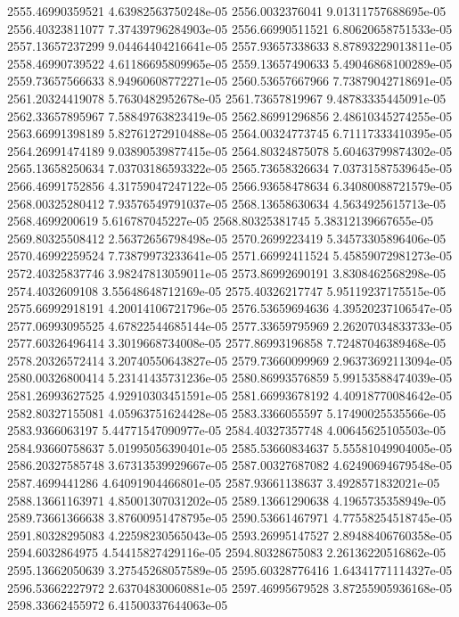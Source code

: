 {2555.46990359521 4.63982563750248e-05
2556.0032376041 9.01311757688695e-05
2556.40323811077 7.37439796284903e-05
2556.66990511521 6.80620658751533e-05
2557.13657237299 9.04464404216641e-05
2557.93657338633 8.87893229013811e-05
2558.46990739522 4.61186695809965e-05
2559.13657490633 5.49046868100289e-05
2559.73657566633 8.94960608772271e-05
2560.53657667966 7.73879042718691e-05
2561.20324419078 5.7630482952678e-05
2561.73657819967 9.48783335445091e-05
2562.33657895967 7.58849763823419e-05
2562.86991296856 2.48610345274255e-05
2563.66991398189 5.82761272910488e-05
2564.00324773745 6.71117333410395e-05
2564.26991474189 9.03890539877415e-05
2564.80324875078 5.60463799874302e-05
2565.13658250634 7.03703186593322e-05
2565.73658326634 7.03731587539645e-05
2566.46991752856 4.31759047247122e-05
2566.93658478634 6.34080088721579e-05
2568.00325280412 7.93576549791037e-05
2568.13658630634 4.5634925615713e-05
2568.4699200619 5.616787045227e-05
2568.80325381745 5.38312139667655e-05
2569.80325508412 2.56372656798498e-05
2570.2699223419 5.34573305896406e-05
2570.46992259524 7.73879973233641e-05
2571.66992411524 5.45859072981273e-05
2572.40325837746 3.98247813059011e-05
2573.86992690191 3.8308462568298e-05
2574.4032609108 3.55648648712169e-05
2575.40326217747 5.95119237175515e-05
2575.66992918191 4.20014106721796e-05
2576.53659694636 4.39520237106547e-05
2577.06993095525 4.67822544685144e-05
2577.33659795969 2.26207034833733e-05
2577.60326496414 3.3019668734008e-05
2577.86993196858 7.72487046389468e-05
2578.20326572414 3.20740550643827e-05
2579.73660099969 2.96373692113094e-05
2580.00326800414 5.23141435731236e-05
2580.86993576859 5.99153588474039e-05
2581.26993627525 4.92910303451591e-05
2581.66993678192 4.40918770084642e-05
2582.80327155081 4.05963751624428e-05
2583.3366055597 5.17490025535566e-05
2583.9366063197 5.44771547090977e-05
2584.40327357748 4.00645625105503e-05
2584.93660758637 5.01995056390401e-05
2585.53660834637 5.55581049904005e-05
2586.20327585748 3.67313539929667e-05
2587.00327687082 4.62490694679548e-05
2587.4699441286 4.64091904466801e-05
2587.93661138637 3.4928571832021e-05
2588.13661163971 4.85001307031202e-05
2589.13661290638 4.1965735358949e-05
2589.73661366638 3.87600951478795e-05
2590.53661467971 4.77558254518745e-05
2591.80328295083 4.22598230565043e-05
2593.26995147527 2.89488406760358e-05
2594.6032864975 4.54415827429116e-05
2594.80328675083 2.26136220516862e-05
2595.13662050639 3.27545268057589e-05
2595.60328776416 1.64341771114327e-05
2596.53662227972 2.63704830060881e-05
2597.46995679528 3.87255905936168e-05
2598.33662455972 6.41500337644063e-05
}
